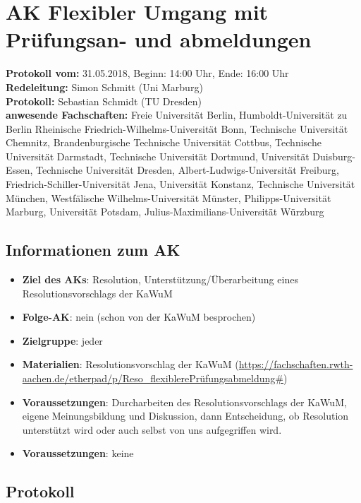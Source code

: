 
\section{AK Flexibler Umgang mit Prüfungsan- und abmeldungen}

  \textbf{Protokoll vom:} 31.05.2018,
  Beginn: 14:00 Uhr,
  Ende: 16:00 Uhr \\
  \textbf{Redeleitung:} Simon Schmitt (Uni Marburg) \\
  \textbf{Protokoll:} Sebastian Schmidt (TU Dresden) \\
  \textbf{anwesende Fachschaften:} Freie Universität Berlin, Humboldt-Universität zu Berlin Rheinische Friedrich-Wilhelms-Universität Bonn, Technische Universität Chemnitz, Brandenburgische Technische Universität Cottbus, Technische Universität Darmstadt, Technische Universität Dortmund, Universität Duisburg-Essen, Technische Universität Dresden, Albert-Ludwigs-Universität Freiburg, Friedrich-Schiller-Universität Jena, Universität Konstanz, Technische Universität München, Westfälische Wilhelms-Universität Münster, Philipps-Universität Marburg, Universität Potsdam, Julius-Maximilians-Universität Würzburg

  \subsection*{Informationen zum AK}
    \begin{itemize}
      \item \textbf{Ziel des AKs}: Resolution, Unterstützung/Überarbeitung eines Resolutionsvorschlags der KaWuM
      \item \textbf{Folge-AK}: nein (schon von der KaWuM besprochen)
      \item \textbf{Zielgruppe}: jeder
      \item \textbf{Materialien}: Resolutionsvorschlag der KaWuM (\url{https://fachschaften.rwth-aachen.de/etherpad/p/Reso_flexiblerePrüfungsabmeldung#})
      \item \textbf{Voraussetzungen}: Durcharbeiten des Resolutionsvorschlags der KaWuM, eigene Meinungsbildung und Diskussion, dann Entscheidung, ob Resolution unterstützt wird oder auch selbst von uns aufgegriffen wird.
      \item \textbf{Voraussetzungen}: keine
    \end{itemize}

  \subsection*{Protokoll}
